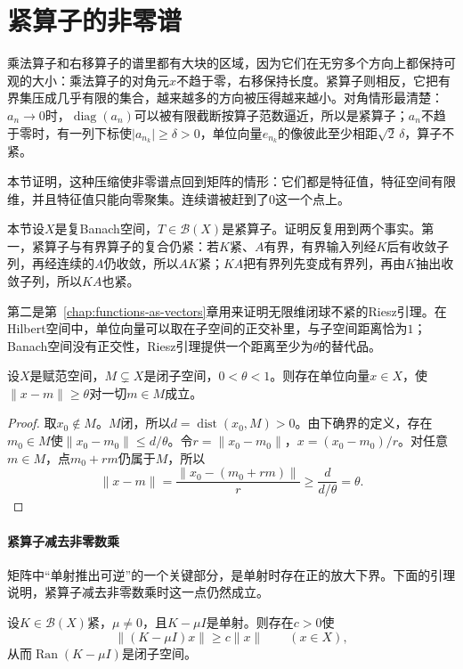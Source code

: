 \section{紧算子的非零谱}
\label{sec:ospec-compact-spectrum}

乘法算子和右移算子的谱里都有大块的区域，因为它们在无穷多个方向上都保持可观的大小：乘法算子的对角元$x$不趋于零，右移保持长度。紧算子则相反，它把有界集压成几乎有限的集合，越来越多的方向被压得越来越小。对角情形最清楚：$a_n\to0$时，$\operatorname{diag}(a_n)$可以被有限截断按算子范数逼近，所以是紧算子；$a_n$不趋于零时，有一列下标使$\lvert a_{n_k}\rvert\geq\delta>0$，单位向量$e_{n_k}$的像彼此至少相距$\sqrt2\,\delta$，算子不紧。

本节证明，这种压缩使非零谱点回到矩阵的情形：它们都是特征值，特征空间有限维，并且特征值只能向零聚集。连续谱被赶到了$0$这一个点上。

本节设$X$是复Banach空间，$T\in\mathcal B(X)$是紧算子。证明反复用到两个事实。第一，紧算子与有界算子的复合仍紧：若$K$紧、$A$有界，有界输入列经$K$后有收敛子列，再经连续的$A$仍收敛，所以$AK$紧；$KA$把有界列先变成有界列，再由$K$抽出收敛子列，所以$KA$也紧。

第二是第~\ref{chap:functions-as-vectors}章用来证明无限维闭球不紧的Riesz引理。在Hilbert空间中，单位向量可以取在子空间的正交补里，与子空间距离恰为$1$；Banach空间没有正交性，Riesz引理提供一个距离至少为$\theta$的替代品。

\begin{lemma}[Riesz引理]
\label{lem:ospec-riesz}
设$X$是赋范空间，$M\subsetneq X$是闭子空间，$0<\theta<1$。则存在单位向量$x\in X$，使$\lVert x-m\rVert\geq\theta$对一切$m\in M$成立。
\end{lemma}

\begin{proof}
取$x_0\notin M$。$M$闭，所以$d=\operatorname{dist}(x_0,M)>0$。由下确界的定义，存在$m_0\in M$使$\lVert x_0-m_0\rVert\leq d/\theta$。令$r=\lVert x_0-m_0\rVert$，$x=(x_0-m_0)/r$。对任意$m\in M$，点$m_0+rm$仍属于$M$，所以
\[
\lVert x-m\rVert=\frac{\lVert x_0-(m_0+rm)\rVert}{r}\geq\frac{d}{d/\theta}=\theta .
\]
\end{proof}

\paragraph{紧算子减去非零数乘}
矩阵中“单射推出可逆”的一个关键部分，是单射时存在正的放大下界。下面的引理说明，紧算子减去非零数乘时这一点仍然成立。

\begin{lemma}[单射推出下有界]
\label{lem:ospec-bounded-below}
设$K\in\mathcal B(X)$紧，$\mu\neq0$，且$K-\mu I$是单射。则存在$c>0$使
\begin{equation}
\lVert(K-\mu I)x\rVert\geq c\lVert x\rVert\qquad(x\in X),
\label{eq:ospec-bounded-below}
\end{equation}
从而$\operatorname{Ran}(K-\mu I)$是闭子空间。
\end{lemma}

